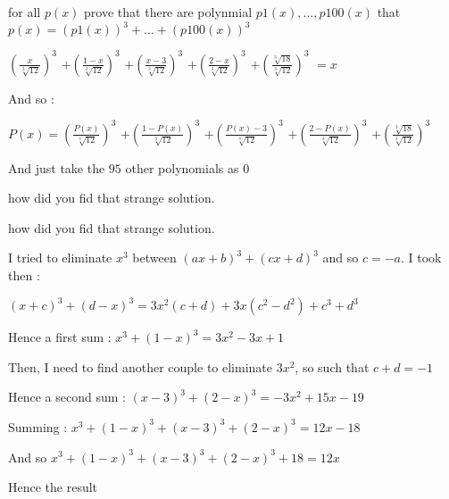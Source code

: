 \begin{solution}
	\begin{tcolorbox}for all $ p(x)$ prove that there are polynmial $ p1(x),...,p100(x)$ that $ p(x) = (p1(x))^3 + ... + (p100(x))^3$\end{tcolorbox}

$ \left(\frac{x}{\sqrt[3]{12}}\right)^3$ $ +\left(\frac{1-x}{\sqrt[3]{12}}\right)^3$ $ +\left(\frac{x-3}{\sqrt[3]{12}}\right)^3$ $ +\left(\frac{2-x}{\sqrt[3]{12}}\right)^3$ $ +\left(\frac{\sqrt[3]{18}}{\sqrt[3]{12}}\right)^3$ $ =x$

And so :

$ P(x)=\left(\frac{P(x)}{\sqrt[3]{12}}\right)^3$ $ +\left(\frac{1-P(x)}{\sqrt[3]{12}}\right)^3$ $ +\left(\frac{P(x)-3}{\sqrt[3]{12}}\right)^3$ $ +\left(\frac{2-P(x)}{\sqrt[3]{12}}\right)^3$ $ +\left(\frac{\sqrt[3]{18}}{\sqrt[3]{12}}\right)^3$

And just take the $ 95$ other polynomials as $ 0$
\end{solution}



\begin{solution}
	how did you fid that strange solution.
\end{solution}



\begin{solution}
	\begin{tcolorbox}how did you fid that strange solution.\end{tcolorbox}

I tried to eliminate $ x^3$ between $ (ax+b)^3+(cx+d)^3$ and so $ c=-a$. I took then :

$ (x+c)^3+(d-x)^3=3x^2(c+d)+3x(c^2-d^2)+c^3+d^3$

Hence a first sum : $ x^3+(1-x)^3=3x^2-3x+1$

Then, I need to find another couple to eliminate $ 3x^2$, so such that $ c+d=-1$

Hence a second sum : $ (x-3)^3+(2-x)^3=-3x^2+15x-19$

Summing : $ x^3+(1-x)^3+(x-3)^3+(2-x)^3=12x-18$

And so $ x^3+(1-x)^3+(x-3)^3+(2-x)^3+18=12x$

Hence the result
\end{solution}



